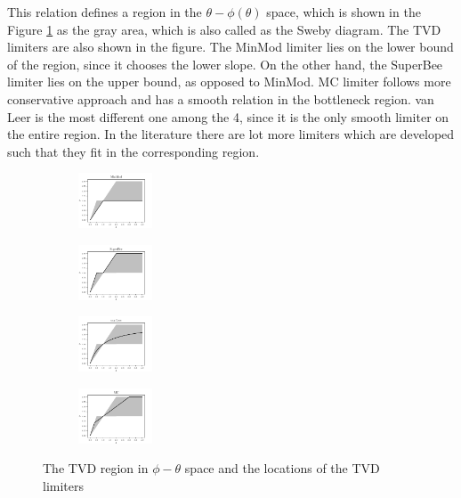 \documentclass[journal,onecolumn]{IEEEtran}
\begin{document}
This relation defines a region in the $\theta - \phi(\theta)$ space, which is shown in the Figure \ref{fig:tvd} as the gray area, which is also called as the Sweby diagram. The TVD limiters are also shown in the figure. The MinMod limiter lies on the lower bound of the region, since it chooses the lower slope. On the other hand, the SuperBee limiter lies on the upper bound, as opposed to MinMod. MC limiter follows more conservative approach and has a smooth relation in the bottleneck region. van Leer is the most different one among the 4, since it is the only smooth limiter on the entire region. In the literature there are lot more limiters which are developed such that they fit in the corresponding region.

\begin{figure}
    \centering
    \begin{subfigure}
    \centering
    \includegraphics[width=0.24\textwidth]{figures/MinMod.pdf}
    \end{subfigure}
    \begin{subfigure}
    \centering
    \includegraphics[width=0.24\textwidth]{figures/SuperBee.pdf}
    \end{subfigure}
    \begin{subfigure}
    \centering
    \includegraphics[width=0.24\textwidth]{figures/vanLeer.pdf}
    \end{subfigure}
    \begin{subfigure}
    \centering
    \includegraphics[width=0.24\textwidth]{figures/MC.pdf}
    \end{subfigure}
    \caption{The TVD region in $\phi-\theta$ space and the locations of the TVD limiters}
    \label{fig:tvd}
\end{figure}
\end{document}
